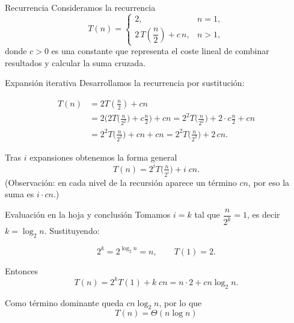 \documentclass{beamer}
\begin{document}
\begin{frame}{Recurrencia}
Consideramos la recurrencia
\[
T(n)=
\begin{cases}
2, & n=1,\\[6pt]
2\,T\!\left(\dfrac{n}{2}\right) + c\,n, & n>1,
\end{cases}
\]
donde \(c>0\) es una constante que representa el coste lineal de combinar resultados y calcular la suma cruzada.
\end{frame}

\begin{frame}{Expansión iterativa}
Desarrollamos la recurrencia por sustitución:

\[
\begin{aligned}
T(n) &= 2T\!\left(\tfrac{n}{2}\right) + c n\\[4pt]
     &= 2\Big(2T\!\big(\tfrac{n}{2^2}\big) + c\tfrac{n}{2}\Big) + c n
      = 2^2 T\!\big(\tfrac{n}{2^2}\big) + 2\cdot c\tfrac{n}{2} + c n\\[4pt]
     &= 2^2 T\!\big(\tfrac{n}{2^2}\big) + c n + c n
     = 2^2 T\!\big(\tfrac{n}{2^2}\big) + 2\,c n.
\end{aligned}
\]

Tras \(i\) expansiones obtenemos la forma general
\[
T(n)=2^{i}T\!\big(\tfrac{n}{2^{i}}\big) + i\; c n.
\]
(Observación: en cada nivel de la recursión aparece un término \(c n\), por eso la suma es \(i\cdot c n\).)
\end{frame}

\begin{frame}{Evaluación en la hoja y conclusión}
Tomamos \(i=k\) tal que \(\dfrac{n}{2^{k}}=1\), es decir \(k=\log_2 n\). Sustituyendo:

\[
2^{k}=2^{\log_2 n}=n,\qquad T(1)=2.
\]

Entonces
\[
T(n)=2^{k}T(1) + k\; c n = n\cdot 2 + c n \log_2 n.
\]

Como término dominante queda \(c n \log_2 n\), por lo que
\[
\boxed{\,T(n)=\Theta(n\log n)\,}
\]


\end{frame}
\end{document}
